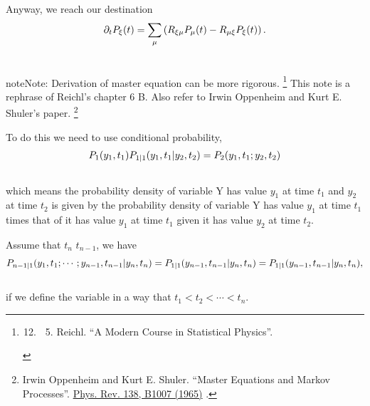 \documentclass[letterpaper,10pt,english]{sphinxmanual}
\begin{document}
Anyway, we reach our destination
\begin{gather}
\begin{split}\partial_t P_\xi(t) = \sum_\mu \left( R_{\xi\mu}P_\mu(t) - R_{\mu\xi}P_\xi(t) \right)  .\end{split}\notag\\\begin{split}\end{split}\notag
\end{gather}
\begin{notice}{note}{Note:}
Derivation of master equation can be more rigorous. \footnote{\begin{enumerate}
\setcounter{enumi}{11}
\item {} \begin{enumerate}
\setcounter{enumi}{4}
\item {} 
Reichl. ``A Modern Course in Statistical Physics''.

\end{enumerate}

\end{enumerate}
} This note is a rephrase of Reichl's chapter 6 B. Also refer to Irwin Oppenheim and Kurt E. Shuler's paper. \footnote{
Irwin Oppenheim and Kurt E. Shuler. ``Master Equations and Markov Processes''. \href{http://journals.aps.org/pr/abstract/10.1103/PhysRev.138.B1007}{Phys. Rev. 138, B1007 (1965)} .
}

To do this we need to use conditional probability,
\begin{gather}
\begin{split}P_1(y_1,t_1) P_{1|1}(y_1,t_1|y_2,t_2) = P_2(y_1,t_1;y_2,t_2)\end{split}\notag\\\begin{split}\end{split}\notag
\end{gather}
which means the probability density of variable Y has value $y_1$ at time $t_1$ and $y_2$ at time $t_2$ is given by the probability density of variable Y has value $y_1$ at time $t_1$ times that of it has value $y_1$ at time $t_1$ given it has value $y_2$ at time $t_2$.

Assume that  $t_n$  $t_{n-1}$, we have
\begin{gather}
\begin{split}P_{n-1|1}(y_1,t_1;\cdots;y_{n-1},t_{n-1}|y_n,t_n) = P_{1|1}(y_{n-1},t_{n-1}|y_n,t_n) = P_{1|1}(y_{n-1},t_{n-1}|y_n,t_n) ,\end{split}\notag\\\begin{split}\end{split}\notag
\end{gather}
if we define the variable in a way that $t_1<t_2< \cdots <t_n$.


\end{notice}
\end{document}
